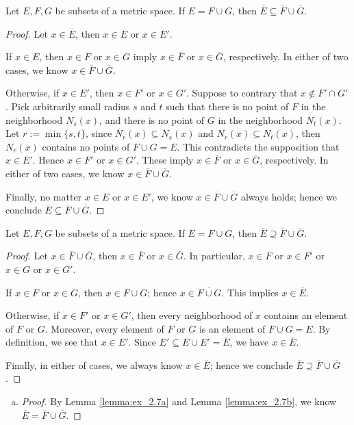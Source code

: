 \begin{Exercise}
\begin{lemma}\label{lemma:ex_2.7a}
Let $E,F,G$ be subsets of a metric space. If $E=F\cup G$, then $\overline{E} \subseteq \overline{F}\cup\overline{G}$.
\end{lemma}
\begin{proof}
Let $x\in\overline{E}$, then $x\in E$ or $x\in E'$.

If $x\in E$, then $x\in F$ or $x\in G$ imply $x\in\overline{F}$ or $x\in\overline{G}$, respectively.
In either of two cases, we know $x\in \overline{F}\cup\overline{G}$.

Otherwise, if $x\in E'$, then $x\in F'$ or $x\in G'$. Suppose to contrary that $x\notin F'\cap G'$. Pick arbitrarily small radius $s$ and $t$ such that there is no point of $F$ in the neighborhood $N_s(x)$, and there is no point of $G$ in the neighborhood $N_t(x)$. Let $r := \min\{s,t\}$, since $N_r(x)\subseteq N_s(x)$ and $N_r(x)\subseteq N_t(x)$, then $N_r(x)$ contains no points of $F\cup G = E$. This contradicts the supposition that $x\in E'$. Hence $x\in F'$ or $x\in G'$. These imply $x\in \overline{F}$ or $x\in \overline{G}$, respectively. In either of two cases, we know $x\in \overline{F}\cup \overline{G}$.

Finally, no matter $x\in E$ or $x\in E'$, we know $x\in \overline{F}\cup \overline{G}$ always holds; hence we conclude $\overline{E} \subseteq \overline{F}\cup \overline{G}$.
\end{proof}

\begin{lemma}\label{lemma:ex_2.7b}
Let $E,F,G$ be subsets of a metric space. If $E=F\cup G$, then $\overline{E} \supseteq \overline{F}\cup\overline{G}$.
\end{lemma}
\begin{proof}
Let $x\in \overline{F}\cup \overline{G}$, then $x\in \overline{F}$ or $x\in \overline{G}$. In particular, $x\in F$ or $x\in F'$ or $x\in G$ or $x\in G'$.

If $x\in F$ or $x\in G$, then $x\in F\cup G$; hence $x\in \overline{F\cup G}$. This implies $x\in \overline{E}$.

Otherwise, if $x\in F'$ or $x\in G'$, then every neighborhood of $x$ contains an element of $F$ or $G$. Moreover, every element of $F$ or $G$ is an element of $F\cup G = E$. By definition, we see that $x\in E'$. Since $E' \subseteq E\cup E' = \overline{E}$, we have $x\in \overline{E}$.

Finally, in either of cases, we always know $x\in \overline{E}$; hence we conclude $\overline{E} \supseteq \overline{F}\cup\overline{G}$.
\end{proof}
\begin{enumerate}[a)]
\item
\begin{proof}
By Lemma \ref{lemma:ex_2.7a} and Lemma  \ref{lemma:ex_2.7b}, we know $\overline{E} = \overline{F}\cup\overline{G}$.


\end{proof}
\end{enumerate}
\end{Exercise}
